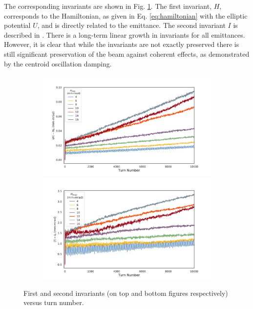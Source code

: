 \documentclass[aps,prstab,twocolumn, groupedaddress]{revtex4-1}
\begin{document}
The corresponding invariants are shown in Fig. \ref{fig:10kinvariants}. The first invariant, 
$H$, corresponds to the Hamiltonian, as given in Eq. \ref{eq:hamiltonian} with the elliptic 
potential $U$, and is directly related to the emittance. The second invariant $I$ is 
described in \cite{danilovNagaitsev:2010}. There is a long-term linear growth in invariants 
for all emittances. However, it is clear that while the invariants are not exactly preserved 
there is still significant preservation of the beam against coherent effects, as 
demonstrated by the centroid oscillation damping.

\begin{figure}[htb]
	\centering
	\begin{subfigure}[b]{\columnwidth}
		\centering
		\includegraphics[width=\columnwidth]{first_inv_mean.pdf}%
		\hfill
		\includegraphics[width=\columnwidth]{second_inv_mean.pdf}
	\end{subfigure}
	\caption{First and second invariants (on top and bottom figures respectively) versus 
	turn number.}
	\label{fig:10kinvariants}
\end{figure}
\end{document}
